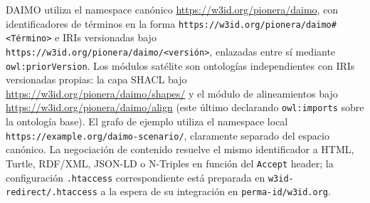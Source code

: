 \documentclass[11pt,a4paper]{article}
\newcommand{\code}[1]{\texttt{#1}}
\begin{document}
DAIMO utiliza el namespace canónico \url{https://w3id.org/pionera/daimo}, con identificadores de términos en la forma \code{https://w3id.org/pionera/daimo\#<Término>} e IRIs versionadas bajo \code{https://w3id.org/pionera/daimo/<versión>}, enlazadas entre sí mediante \code{owl:priorVersion}. Los módulos satélite son ontologías independientes con IRIs versionadas propias: la capa SHACL bajo \url{https://w3id.org/pionera/daimo/shapes/} y el módulo de alineamientos bajo \url{https://w3id.org/pionera/daimo/align} (este último declarando \code{owl:imports} sobre la ontología base). El grafo de ejemplo utiliza el namespace local \code{https://example.org/daimo-scenario/}, claramente separado del espacio canónico. La negociación de contenido resuelve el mismo identificador a HTML, Turtle, RDF/XML, JSON-LD o N-Triples en función del \code{Accept} header; la configuración \code{.htaccess} correspondiente está preparada en \code{w3id-redirect/.htaccess} a la espera de su integración en \code{perma-id/w3id.org}.
\end{document}
